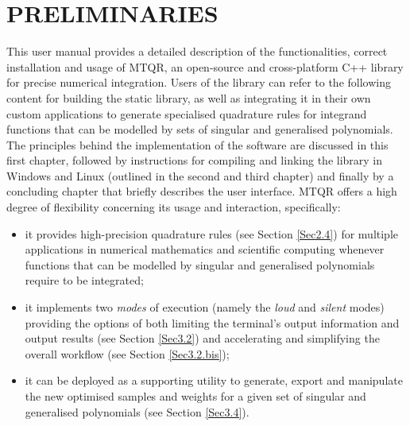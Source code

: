 \documentclass[a4paper, twosided]{book}
\begin{document}
\tableofcontents

\mainmatter


\chapter[Preliminaries]{\Huge \ttfamily PRELIMINARIES}

This user manual provides a detailed description of the functionalities, correct installation and usage of MTQR, an open-source and cross-platform C++ library for precise numerical integration. Users of the library can refer to the following content for building the static library, as well as integrating it in their own custom applications to generate specialised quadrature rules for integrand functions that can be modelled by sets of singular and generalised polynomials. The principles behind the implementation of the software are discussed in this first chapter, followed by instructions for compiling and linking the library in Windows and Linux (outlined in the second and third chapter) and finally by a concluding chapter that briefly describes the user interface. MTQR offers a high degree of flexibility concerning its usage and interaction, specifically:
\begin{itemize}
    \item it provides high-precision quadrature rules (see Section \ref{Sec2.4}) for multiple applications in numerical mathematics and scientific computing whenever functions that can be modelled by singular and generalised polynomials require to be integrated;
    \item it implements two {\itshape modes} of execution (namely the {\itshape loud} and {\itshape silent} modes) providing the options of both limiting the terminal's output information and output results (see Section \ref{Sec3.2}) and accelerating and simplifying the overall workflow (see Section \ref{Sec3.2.bis});
    \item it can be deployed as a supporting utility to generate, export and manipulate the new optimised samples and weights for a given set of singular and generalised polynomials (see Section \ref{Sec3.4}).
\end{itemize}
\end{document}
